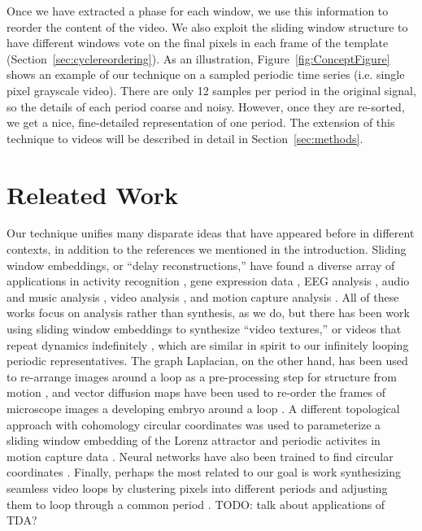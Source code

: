 \documentclass{article}
\begin{document}
Once we have extracted a phase for each window, we use this information to reorder the content of the video.  We also exploit the sliding window structure to have different windows vote on the final pixels in each frame of the template (Section~\ref{sec:cyclereordering}).  As an illustration, Figure~\ref{fig:ConceptFigure} shows an example of our technique on a sampled periodic time series (i.e. single pixel grayscale video).  There are only 12 samples per period in the original signal, so the details of each period coarse and noisy.  However, once they are re-sorted, we get a nice, fine-detailed representation of one period.  The extension of this technique to videos will be described in detail in Section~\ref{sec:methods}.


\section{Releated Work}
Our technique unifies many disparate ideas that have appeared before in different contexts, in addition to the references we mentioned in the introduction.  Sliding window embeddings, or ``delay reconstructions,'' have found a diverse array of applications in activity recognition \cite{frank2010activity,venkataraman2016shape}, gene expression data \cite{perea2015sw1pers}, EEG analysis \cite{stam2005nonlinear, plesnik2014detection}, audio and music analysis \cite{herzel1994analysis,serra2009cross,bello2011measuring,traliemoebius}, video analysis \cite{schodl2000video, tralie2017quasi}, and motion capture analysis \cite{venkataraman2016shape}.  All of these works focus on analysis rather than synthesis, as we do, but there has been work using sliding window embeddings to synthesize ``video textures,'' or videos that repeat dynamics indefinitely \cite{schodl2000video}, which are similar in spirit to our infinitely looping periodic representatives.  The graph Laplacian, on the other hand, has been used to re-arrange images around a loop as a pre-processing step for structure from motion \cite{averbuch2015ringit}, and vector diffusion maps have been used to re-order the frames of microscope images a developing embryo around a loop \cite{dsilva2015diffusionvecordering}.  A different topological approach with cohomology circular coordinates\cite{de2011persistent} was used to parameterize a sliding window embedding of the Lorenz attractor \cite{de2012topological} and periodic activites in motion capture data \cite{vejdemo2015cohomological}.  Neural networks have also been trained to find circular coordinates \cite{levy2015live,anafi2017cyclops}.  Finally, perhaps the most related to our goal is work synthesizing seamless video loops by clustering pixels into different periods and adjusting them to loop through a common period \cite{Liao2013VideoLoops,Liao2015VideoLoops}.  TODO: talk about applications of TDA?
\end{document}
